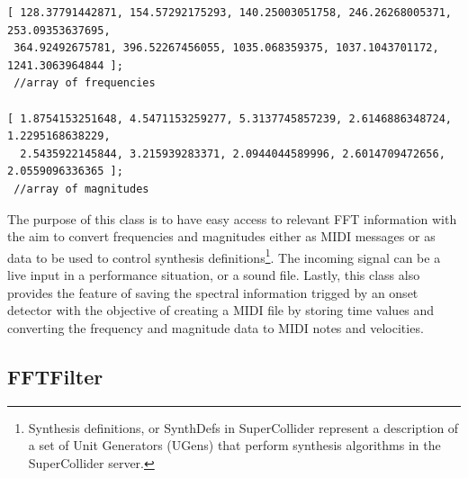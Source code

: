 \begin{verbatim}
[ 128.37791442871, 154.57292175293, 140.25003051758, 246.26268005371, 253.09353637695,
 364.92492675781, 396.52267456055, 1035.068359375, 1037.1043701172, 1241.3063964844 ]; 
 //array of frequencies

[ 1.8754153251648, 4.5471153259277, 5.3137745857239, 2.6146886348724, 1.2295168638229,
  2.5435922145844, 3.215939283371, 2.0944044589996, 2.6014709472656, 2.0559096336365 ]; 
 //array of magnitudes
\end{verbatim}
The purpose of this class is to have easy access to relevant FFT information with the aim to convert frequencies and magnitudes either as MIDI messages or as data to be used to control synthesis definitions\footnote{Synthesis definitions, or SynthDefs in SuperCollider represent a description of a set of Unit Generators (UGens) that perform synthesis algorithms in the SuperCollider server.}. The incoming signal can be a live input in a performance situation, or a sound file. Lastly, this class also provides the feature of saving the spectral information trigged by an onset detector with the objective of  creating a MIDI file by storing time values and converting the frequency and magnitude data to MIDI notes and velocities.

\subsection{FFTFilter}

